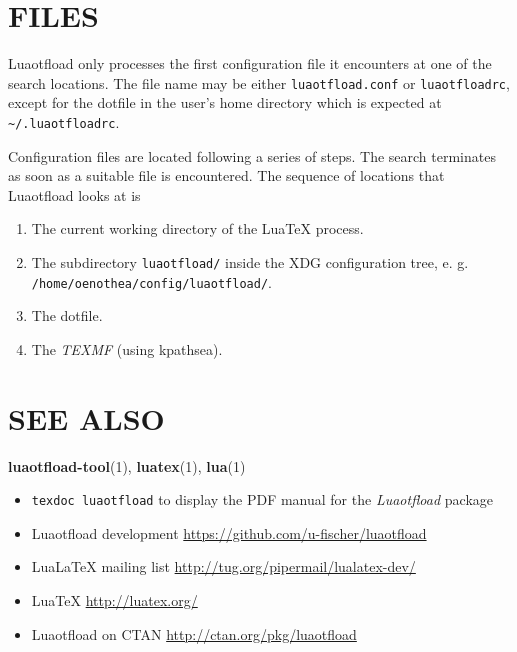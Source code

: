 \documentclass[a4paper]{article}
\begin{document}
\section{FILES%
  \label{files}%
}

Luaotfload only processes the first configuration file it encounters at
one of the search locations. The file name may be either
\texttt{luaotfload.conf} or \texttt{luaotfloadrc}, except for the dotfile in the
user’s home directory which is expected at \texttt{\textasciitilde{}/.luaotfloadrc}.

Configuration files are located following a series of steps. The search
terminates as soon as a suitable file is encountered. The sequence of
locations that Luaotfload looks at is

\begin{enumerate}
\renewcommand{\labelenumi}{\roman{enumi}.}
\item The current working directory of the LuaTeX process.

\item The subdirectory \texttt{luaotfload/} inside the XDG configuration
tree, e. g. \texttt{/home/oenothea/config/luaotfload/}.

\item The dotfile.

\item The \emph{TEXMF} (using kpathsea).
\end{enumerate}


\section{SEE ALSO%
  \label{see-also}%
}

\textbf{luaotfload-tool}(1), \textbf{luatex}(1), \textbf{lua}(1)

\begin{itemize}
\item \texttt{texdoc luaotfload} to display the PDF manual for the \emph{Luaotfload}
package

\item Luaotfload development \url{https://github.com/u-fischer/luaotfload}

\item LuaLaTeX mailing list  \url{http://tug.org/pipermail/lualatex-dev/}

\item LuaTeX                 \url{http://luatex.org/}

\item Luaotfload on CTAN     \url{http://ctan.org/pkg/luaotfload}
\end{itemize}
\end{document}
